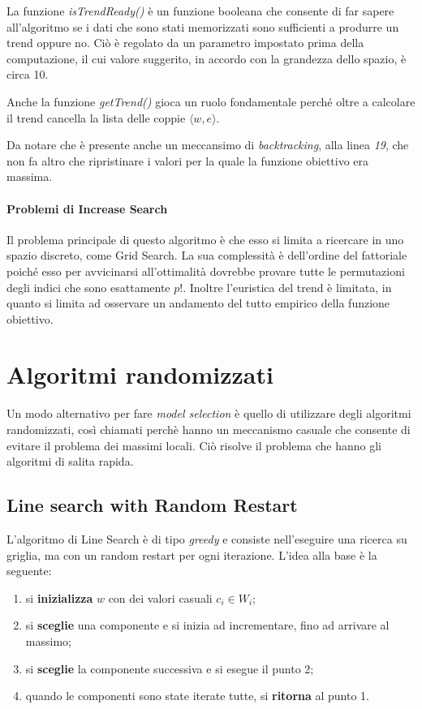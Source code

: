 La funzione \textit{isTrendReady()} è un funzione booleana
che consente di far sapere all'algoritmo se i dati che sono stati memorizzati
sono sufficienti a produrre un trend oppure no. Ciò è regolato da un
parametro impostato prima della computazione, il cui valore
suggerito, in accordo con la grandezza dello spazio, è circa 10.

Anche la funzione \textit{getTrend()} gioca un ruolo fondamentale
perché oltre a calcolare il trend cancella la lista delle coppie
$\langle w, e\rangle$.

Da notare che è presente anche un meccansimo di \textit{backtracking},
alla linea \textit{19}, che non fa altro che ripristinare
i valori per la quale la funzione obiettivo era massima.

\paragraph{Problemi di Increase Search}
Il problema principale di questo algoritmo è che esso si limita a ricercare
in uno spazio discreto, come Grid Search. La sua complessità è dell'ordine
del fattoriale poiché esso per avvicinarsi all'ottimalità dovrebbe
provare tutte le permutazioni degli indici che sono esattamente $p!$.
Inoltre l'euristica del trend è limitata, in quanto si limita
ad osservare un andamento del tutto empirico della funzione obiettivo.

\section{Algoritmi randomizzati}
Un modo alternativo per fare \textit{model selection} è quello di utilizzare degli algoritmi randomizzati,
così chiamati perchè hanno un meccanismo casuale che consente di evitare
il problema dei massimi locali. Ciò risolve il problema che hanno gli algoritmi di salita rapida.

\subsection{Line search with Random Restart}
L'algoritmo di Line Search è di tipo \textit{greedy} e consiste nell'eseguire
una ricerca su griglia, ma con un random restart per ogni iterazione.
L'idea alla base è la seguente:

\begin{enumerate}
	\item si \textbf{inizializza} $w$ con dei valori casuali $c_i \in W_i$;
	\item si \textbf{sceglie} una componente e si inizia ad incrementare, fino ad arrivare al massimo;
	\item si \textbf{sceglie} la componente successiva e si esegue il punto 2;
	\item quando le componenti sono state iterate tutte, si \textbf{ritorna} al punto 1.
\end{enumerate}

